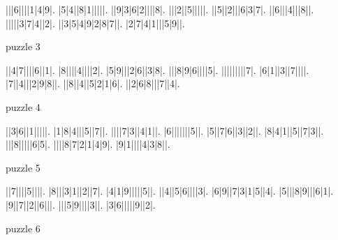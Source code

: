 \documentclass[12pt, letterpaper]{article}
\begin{document}
\thispagestyle{empty}
\begin{multicols}{2}
\begin{sudoku}
|||6||||1|4|9|.
|5|4||8|1|||||.
||9|3|6|2||||8|.
|||2||5|||||.
||5||2|||6|3|7|.
||6|||4|||8||.
|||||3|7|4||2|.
||3|5|4|9|2|8|7||.
|2|7|4|1|||5|9||.
\end{sudoku}
\begin{center}
    puzzle 3
\end{center}
\begin{sudoku}
||4|7||||6||1|.
|8||||4||||2|.
|5|9|||2|6||3|8|.
|||8|9|6||||5|.
|||||||||7|.
|6|1||3||7||||.
|7||4|||2|9|8||.
||8||4||5|2|1|6|.
||2|6|8|||7||4|.
\end{sudoku}
\begin{center}
    puzzle 4
\end{center}
\columnbreak
\begin{sudoku}
||3|6||1|||||.
|1|8|4|||5||7||.
||||7|3||4|1||.
|6|||||||5||.
|5||7|6||3||2||.
|8|4|1||5||7|3||.
|||8|||||6|5|.
||||8|7|2|1|4|9|.
|9|1||||4|3|8||.
\end{sudoku}
\begin{center}
    puzzle 5
\end{center}
\begin{sudoku}
||7||||5||||.
|8|||3|1||2||7|.
|4|1|9|||||5||.
||4||5|6||||3|.
|6|9||7|3|1|5||4|.
|5|||8|9|||6|1|.
|9||7||2||6|||.
|||5|9||||3||.
|3|6|||||9||2|.
\end{sudoku}
\begin{center}
    puzzle 6
\end{center}
\end{multicols}
\end{document}
